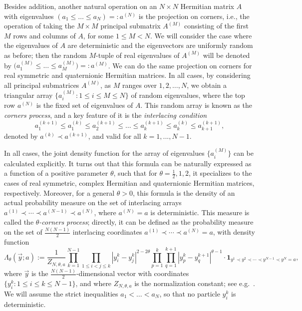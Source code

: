 \documentclass[11pt]{article}
\theoremstyle{plain}
\begin{document}
Besides addition, another natural operation on an $N\times N$ Hermitian matrix $A$ with eigenvalues $(a_1\le\dots\le a_N)=:a^{(N)}$ is the projection on corners, i.e., the operation of taking the $M\times M$ principal submatrix $A^{(M)}$ consisting of the first $M$ rows and columns of $A$, for some $1\le M<N$.
We will consider the case where the eigenvalues of $A$ are deterministic and the eigenvectors are uniformly random as before; then the random $M$-tuple of real eigenvalues of $A^{(M)}$ will be denoted by $\big(a^{(M)}_1\le...\le a^{(M)}_M\big)=:a^{(M)}$.
We can do the same projection on corners for real symmetric and quaternionic Hermitian matrices.
In all cases, by considering all principal submatrices $A^{(M)}$, as $M$ ranges over $1,2,\dots,N$, we obtain a triangular array $\big\{a^{(M)}_i \colon 1\le i\le M\le N\big\}$ of random eigenvalues, where the top row $a^{(N)}$ is the fixed set of eigenvalues of $A$.
This random array is known as the \emph{corners process}, and a key feature of it is the \emph{interlacing condition} 
\[
a^{(k+1)}_1\le a^{(k)}_1\le a^{(k+1)}_2\le\dots \le a^{(k+1)}_k\le a^{(k)}_k\le a^{(k+1)}_{k+1},
\]
denoted by $a^{(k)}\prec a^{(k+1)}$, and valid for all $k=1,...,N-1$.

In all cases, the joint density function for the array of eigenvalues $\big\{a^{(M)}_i\big\}$ can be calculated explicitly.
It turns out that this formula can be naturally expressed as a function of a positive parameter $\theta$, such that for $\theta=\frac{1}{2},1,2$, it specializes to the cases of real symmetric, complex Hermitian and quaternionic Hermitian matrices, respectively.
Moreover, for a general $\theta>0$, this formula is the density of an actual probability measure on the set of interlacing arrays $a^{(1)}\prec\cdots\prec a^{(N-1)}\prec a^{(N)}$, where $a^{(N)}=a$ is deterministic.
This measure is called the \emph{$\theta$-corners process}; directly, it can be defined as the probability measure on the set of $\frac{N(N-1)}{2}$ interlacing coordinates $a^{(1)}\prec\cdots\prec a^{(N)}=a$, with density function
\begin{equation}\label{eq_thetacorners}
    \Lambda_{\theta}(\vec{y};a) := \frac{1}{Z_{N,\theta,a}}\prod_{k=1}^{N-1}\prod_{1\le i<j\le k}|y^k_i - y_j^k|^{2-2\theta}\prod_{p=1}^{k}\prod_{q=1}^{k+1}|y_{p}^{k}-y_{q}^{k+1}|^{\theta-1}\cdot\mathbf{1}_{y^{1}\prec y^{2}\prec\cdots \prec y^{N-1}\prec y^N=a},
\end{equation}
where $\vec{y}$ is the $\frac{N(N-1)}{2}$-dimensional vector with coordinates $\{y^k_i \colon 1\le i\le k\le N-1\}$, and where $Z_{N,\theta,a}$ is the normalization constant; see e.g.~\cite[Sec.~2]{Cue}.
We will assume the strict inequalities $a_1<\dots<a_N$, so that no particle $y^k_i$ is deterministic.
\end{document}
